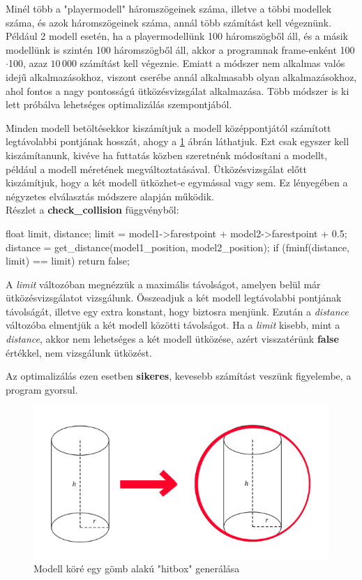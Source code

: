 
Minél több a "playermodell" háromszögeinek száma, illetve a többi modellek száma, és azok háromszögeinek száma, annál több számítást kell végeznünk. Például 2 modell esetén, ha a playermodellünk 100 háromszögből áll, és a másik modellünk is szintén 100 háromszögből áll, akkor a programnak frame-enként 100$\cdot$100, azaz $10\,000$ számítást kell végeznie. Emiatt a módszer nem alkalmas valós idejű alkalmazásokhoz, viszont cserébe annál alkalmasabb olyan alkalmazásokhoz, ahol fontos a nagy pontosságú ütközésvizsgálat alkalmazása. Több módszer is ki lett próbálva lehetséges optimalizálás szempontjából.

Minden modell betöltésekkor kiszámítjuk a modell középpontjától számított legtávolabbi pontjának hosszát, ahogy a \ref{fig:opt_1} ábrán láthatjuk. Ezt csak egyszer kell kiszámítanunk, kivéve ha futtatás közben szeretnénk módosítani a modellt, például a modell méretének megváltoztatásával. Ütközésvizsgálat előtt kiszámítjuk, hogy a két modell ütközhet-e egymással vagy sem. Ez lényegében a négyzetes elválasztás módszere alapján működik.
\\
Részlet a \textbf{check\_collision} függvényből:
\begin{cpp}
float limit, distance;
limit = model1->farestpoint + model2->farestpoint + 0.5;
distance = get_distance(model1_position, model2_position);
if (fminf(distance, limit) == limit)
{
    return false;
}
\end{cpp}
\newpage
A \textit{limit} változóban megnézzük a maximális távolságot, amelyen belül már ütközésvizsgálatot vizsgálunk. Összeadjuk a két modell legtávolabbi pontjának távolságát, illetve egy extra konstant, hogy biztosra menjünk. Ezután a \textit{distance} változóba elmentjük a két modell közötti távolságot. Ha a \textit{limit} kisebb, mint a \textit{distance}, akkor nem lehetséges a két modell ütközése, azért visszatérünk \textbf{false} értékkel, nem vizsgálunk ütközést.

Az optimalizálás ezen esetben \textbf{sikeres}, kevesebb számítást veszünk figyelembe, a program gyorsul.
\begin{figure}[h]
	\centering
	\includegraphics[width=13truecm, height=7.5truecm]{images/opt_5.1.png}
	\caption{Modell köré egy gömb alakú "hitbox" generálása}
	\label{fig:opt_1}
\end{figure}


